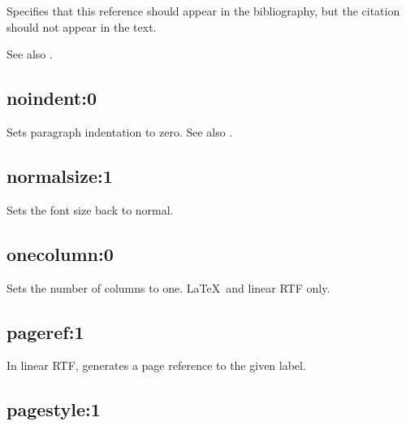 Specifies that this reference should appear in the bibliography,
but the citation should not appear in the text.

See also .

\subsection*{noindent:0}\label{noindent}

Sets paragraph indentation to zero. See also .


\subsection*{normalsize:1}\label{normalsize}

Sets the font size back to normal.

\subsection*{onecolumn:0}\label{onecolumn}

Sets the number of columns to one. \LaTeX\ and linear RTF only.

\subsection*{pageref:1}\label{pageref}

In linear RTF, generates a page reference to the given label.

\subsection*{pagestyle:1}\label{pagestyle}

